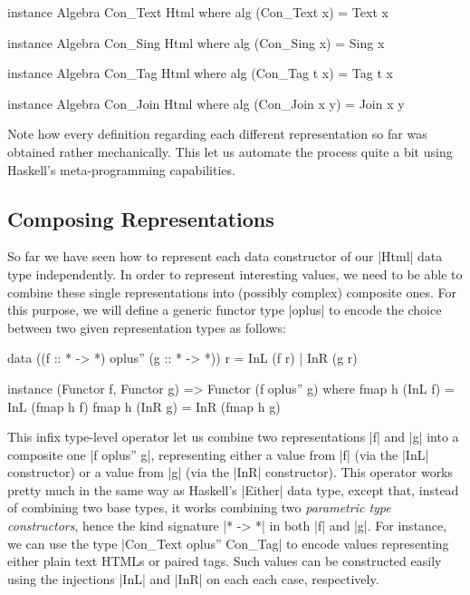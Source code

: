 \begin{code}
instance Algebra Con_Text Html where
  alg (Con_Text x) = Text x

instance Algebra Con_Sing Html where
  alg (Con_Sing x) = Sing x

instance Algebra Con_Tag Html where
  alg (Con_Tag t x) = Tag t x

instance Algebra Con_Join Html where
  alg (Con_Join x y) = Join x y
\end{code}
%
Note how every definition regarding each different representation so far was
obtained rather mechanically.
%
This let us automate the process quite a bit using Haskell's meta-programming
capabilities.


%
\subsection{Composing Representations}

So far we have seen how to represent each data constructor of our |Html| data
type independently.
%
In order to represent interesting values, we need to be able to combine these
single representations into (possibly complex) composite ones.
%
For this purpose, we will define a generic functor type |oplus| to encode the
choice between two given representation types as follows:

\begin{code}
data ((f :: * -> *) oplus'' (g :: * -> *)) r = InL (f r) | InR (g r)

instance (Functor f, Functor g) => Functor (f oplus'' g)
  where  fmap h (InL f) = InL (fmap h f)
         fmap h (InR g) = InR (fmap h g)

\end{code}
%
This infix type-level operator let us combine two representations |f| and |g|
into a composite one |f oplus'' g|, representing either a value from |f| (via
the |InL| constructor) or a value from |g| (via the |InR| constructor).
%
This operator works pretty much in the same way as Haskell's |Either| data type,
except that, instead of combining two base types, it works combining two
\emph{parametric type constructors}, hence the kind signature |* -> *| in both
|f| and |g|.
%
For instance, we can use the type |Con_Text oplus'' Con_Tag| to encode values
representing either plain text HTMLs or paired tags.
%
Such values can be constructed easily using the injections |InL| and |InR| on
each each case, respectively.


